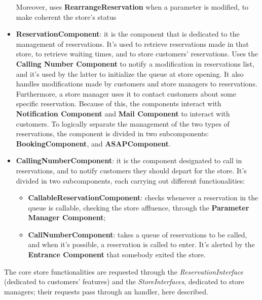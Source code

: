 \documentclass{article}
\begin{document}
\begin{itemize}
				Moreover, uses {\bfseries RearrangeReservation} when a parameter is modified, to make coherent the store’s status
				
				\item {\bfseries ReservationComponent}: it is the component that is dedicated to the management of reservations. It’s used to retrieve reservations made in that store, to retrieve waiting times, and to store customers’ reservations. Uses the {\bfseries Calling Number Component} to notify a modification in reservations list, and it’s used by the latter to initialize the queue at store opening. It also handles modifications made by customers and store managers to reservations. Furthermore, a store manager uses it to contact customers about some specific reservation. Because of this, the components interact with {\bfseries Notification Component} and {\bfseries Mail Component} to interact with customers. 
				To logically separate the management of the two types of reservations, the component is divided in two subcomponents: {\bfseries BookingComponent}, and {\bfseries ASAPComponent}.
				
				\item {\bfseries CallingNumberComponent}: it is the component designated to call in reservations, and to notify customers they should depart for the store. It’s divided in two subcomponents, each carrying out different functionalities:
				
				\begin{itemize}
					\item {\bfseries CallableReservationComponent}: checks whenever a reservation in the queue is callable, checking the store affluence, through the {\bfseries Parameter Manager Component};
					
					\item {\bfseries CallNumberComponent}: takes a queue of reservations to be called, and when it’s possible, a reservation is called to enter. It’s alerted by the {\bfseries Entrance Component} that somebody exited the store.
				\end{itemize}
			\end{itemize}
		
			The core store functionalities are requested through the \emph{ReservationInterface} (dedicated to customers’ features) and the \emph{StoreInterfaces}, dedicated to store managers; their requests pass through an handler, here described. 
			
\end{document}
